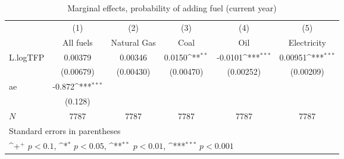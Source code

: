 \begin{table}[htbp]\centering
\def\sym#1{\ifmmode^{#1}\else\(^{#1}\)\fi}
\caption{Marginal effects, probability of adding fuel (current year)}
\begin{tabular}{l*{5}{c}}
\hline\hline
            &\multicolumn{1}{c}{(1)}&\multicolumn{1}{c}{(2)}&\multicolumn{1}{c}{(3)}&\multicolumn{1}{c}{(4)}&\multicolumn{1}{c}{(5)}\\
            &\multicolumn{1}{c}{All fuels}&\multicolumn{1}{c}{Natural Gas}&\multicolumn{1}{c}{Coal}&\multicolumn{1}{c}{Oil}&\multicolumn{1}{c}{Electricity}\\
\hline
L.logTFP    &     0.00379         &     0.00346         &      0.0150\sym{**} &     -0.0101\sym{***}&     0.00951\sym{***}\\
            &   (0.00679)         &   (0.00430)         &   (0.00470)         &   (0.00252)         &   (0.00209)         \\
[1em]
ae          &      -0.872\sym{***}&                     &                     &                     &                     \\
            &     (0.128)         &                     &                     &                     &                     \\
\hline
\(N\)       &        7787         &        7787         &        7787         &        7787         &        7787         \\
\hline\hline
\multicolumn{6}{l}{\footnotesize Standard errors in parentheses}\\
\multicolumn{6}{l}{\footnotesize \sym{+} \(p<0.1\), \sym{*} \(p<0.05\), \sym{**} \(p<0.01\), \sym{***} \(p<0.001\)}\\
\end{tabular}
\end{table}
